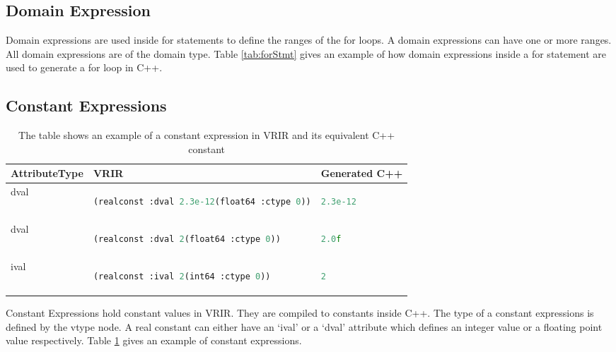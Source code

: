 \subsection{Domain Expression}
Domain expressions are used inside for statements to define the ranges of the for loops. A domain expressions can have one or more ranges. All domain expressions are of the domain type. Table \ref{tab:forStmt} gives an example of how domain expressions inside a for statement are used to generate a for loop in C++.
\subsection{Constant Expressions}
\begin{table}[htbp]
\centering
\begin{tabular}{|l|l|l|}
\hline

AttributeType & VRIR &  Generated C++ \\
\hline
dval &
{
\begin{lstlisting}[language=lisp,frame=none, numbers=none]
(realconst :dval 2.3e-12(float64 :ctype 0))
\end{lstlisting}
}
&
{
\begin{lstlisting}[language=c,frame=none, numbers=none]
2.3e-12
\end{lstlisting}
} \\
\hline
dval &
{
\begin{lstlisting}[language=lisp,frame=none, numbers=none]
(realconst :dval 2(float64 :ctype 0))
\end{lstlisting}
}
&
{
\begin{lstlisting}[language=c,frame=none, numbers=none]
2.0f
\end{lstlisting}
} \\
\hline
ival &
{
\begin{lstlisting}[language=lisp,frame=none, numbers=none]
(realconst :ival 2(int64 :ctype 0))
\end{lstlisting}
}
&
{
\begin{lstlisting}[language=c,frame=none, numbers=none]
2
\end{lstlisting}
} \\
\hline
\end{tabular}
\caption[Constant Expression example]{The table shows an example of a constant expression in VRIR and its equivalent C++ constant}
\label{tab:constExpr}
\end{table}
Constant Expressions hold constant values in VRIR. They are compiled to constants inside C++. The type of a constant expressions is defined by the vtype node. A real constant can either have an `ival' or a `dval' attribute which defines an integer value or a floating point value respectively. Table \ref{tab:constExpr} gives an example of constant expressions.

